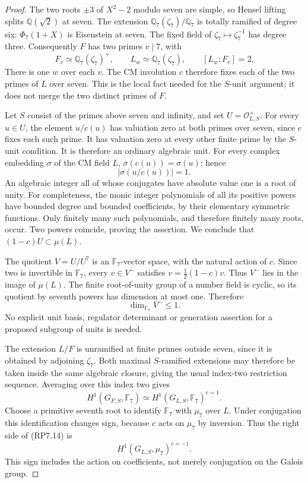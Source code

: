 \begin{proof}
The two roots $\pm3$ of $X^2-2$ modulo seven are simple, so
Hensel lifting splits $\mathbb Q(\sqrt2)$ at seven.
The extension $\mathbb Q_7(\zeta_7)/\mathbb Q_7$ is totally
ramified of degree six: $\Phi_7(1+X)$ is Eisenstein at seven.
The fixed field of $\zeta_7\mapsto\zeta_7^{-1}$ has degree three.
Consequently $F$ has
two primes $v\mid7$, with
\[
 F_v\simeq\mathbb Q_7(\zeta_7)^+,
 \qquad L_w\simeq\mathbb Q_7(\zeta_7),
 \qquad [L_w:F_v]=2.
 \tag{RP7.11}
\]
There is one $w$ over each $v$. The CM involution $c$ therefore
fixes each of the two primes of $L$ over seven. This is the
local fact needed for the $S$-unit argument; it does not merge
the two distinct primes of $F$.

Let $S$ consist of the primes above seven and infinity, and set
$U=\mathcal O_{L,S}^{\times}$.
For every $u\in U$, the element $u/c(u)$ has valuation zero
at both primes over seven, since $c$ fixes each such prime.
It has valuation zero at every other finite prime by the
$S$-unit condition. It is therefore an ordinary algebraic unit.
For every complex embedding $\sigma$ of the CM field $L$,
$\sigma(c(u))=\overline{\sigma(u)}$; hence
\[
                  |\sigma(u/c(u))|=1.
 \tag{RP7.12}
\]
An algebraic integer all of whose conjugates have absolute
value one is a root of unity. For completeness, the monic
integer polynomials of all its positive powers have bounded
degree and bounded coefficients, by their elementary symmetric
functions. Only finitely many such polynomials, and therefore
finitely many roots, occur. Two powers coincide, proving the
assertion. We conclude that $(1-c)U\subset\mu(L)$.

The quotient $V=U/U^7$ is an $\mathbb F_7$-vector space, with
the natural action of $c$. Since two is invertible in
$\mathbb F_7$, every $v\in V^-$ satisfies
$v=\tfrac12(1-c)v$. Thus $V^-$ lies in the image of $\mu(L)$.
The finite root-of-unity group of a number field is cyclic,
so its quotient by seventh powers has dimension at most one.
Therefore
\[
                              \dim_{\mathbb F_7}V^-\leq1.
 \tag{RP7.13}
\]
No explicit unit basis, regulator determinant or generation
assertion for a proposed subgroup of units is needed.

The extension $L/F$ is unramified at finite primes outside
seven, since it is obtained by adjoining $\zeta_7$.
Both maximal $S$-ramified extensions may therefore be taken
inside the same algebraic closure, giving the usual
index-two restriction sequence. Averaging over this index
two gives
\[
 H^1(G_{F,S},\mathbb F_7)
       \simeq H^1(G_{L,S},\mathbb F_7)^{c=1}.
 \tag{RP7.14}
\]
Choose a primitive seventh root to identify $\mathbb F_7$
with $\mu_7$ over $L$. Under conjugation this identification
changes sign, because $c$ acts on $\mu_7$ by inversion.
Thus the right side of (RP7.14) is
\[
                       H^1(G_{L,S},\mu_7)^{c=-1}.
 \tag{RP7.15}
\]
This sign includes the action on coefficients, not merely
conjugation on the Galois group.


\end{proof}
